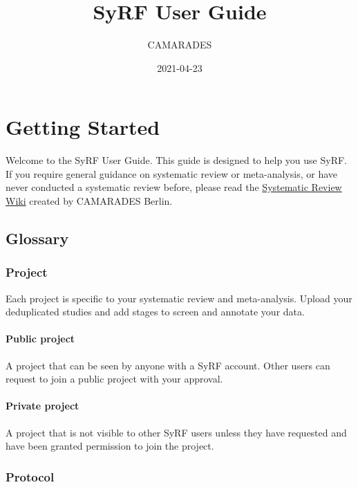 \documentclass[
]{book}
\title{SyRF User Guide}
\author{CAMARADES}
\date{2021-04-23}
\begin{document}
\maketitle

{
\setcounter{tocdepth}{1}
\tableofcontents
}
\hypertarget{index}{%
\chapter{Getting Started}\label{index}}

Welcome to the SyRF User Guide. This guide is designed to help you use SyRF. If you require general guidance on systematic review or meta-analysis, or have never conducted a systematic review before, please read the \href{https://www.camarades.de/}{Systematic Review Wiki} created by CAMARADES Berlin.

\hypertarget{glossary}{%
\section{Glossary}\label{glossary}}

\hypertarget{project}{%
\subsection{Project}\label{project}}

Each project is specific to your systematic review and meta-analysis. Upload your deduplicated studies and add stages to screen and annotate your data.

\hypertarget{public-project}{%
\subsubsection{Public project}\label{public-project}}

A project that can be seen by anyone with a SyRF account. Other users can request to join a public project with your approval.

\hypertarget{private-project}{%
\subsubsection{Private project}\label{private-project}}

A project that is not visible to other SyRF users unless they have requested and have been granted permission to join the project.

\hypertarget{protocol}{%
\subsection{Protocol}\label{protocol}}
\end{document}
